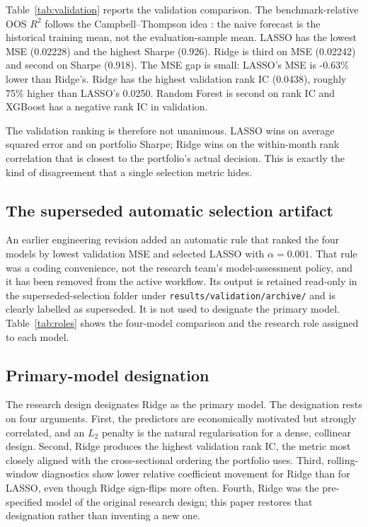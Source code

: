 \documentclass[11pt,a4paper]{article}
\begin{document}
Table~\ref{tab:validation} reports the validation comparison. The benchmark-relative OOS $R^2$ follows the Campbell--Thompson idea \citep{campbell2008}: the naive forecast is the historical training mean, not the evaluation-sample mean. LASSO has the lowest MSE (0.02228) and the highest Sharpe (0.926). Ridge is third on MSE (0.02242) and second on Sharpe (0.918). The MSE gap is small: LASSO's MSE is -0.63\% lower than Ridge's. Ridge has the highest validation rank IC (0.0438), roughly 75\% higher than LASSO's 0.0250. Random Forest is second on rank IC and XGBoost has a negative rank IC in validation.

The validation ranking is therefore not unanimous. LASSO wins on average squared error and on portfolio Sharpe; Ridge wins on the within-month rank correlation that is closest to the portfolio's actual decision. This is exactly the kind of disagreement that a single selection metric hides.



\subsection{The superseded automatic selection artifact}

An earlier engineering revision added an automatic rule that ranked the four models by lowest validation MSE and selected LASSO with $\alpha=0.001$. That rule was a coding convenience, not the research team's model-assessment policy, and it has been removed from the active workflow. Its output is retained read-only in the superseded-selection folder under \texttt{results/validation/archive/} and is clearly labelled as superseded. It is not used to designate the primary model. Table~\ref{tab:roles} shows the four-model comparison and the research role assigned to each model.



\subsection{Primary-model designation}

The research design designates Ridge as the primary model. The designation rests on four arguments. First, the predictors are economically motivated but strongly correlated, and an $L_2$ penalty is the natural regularisation for a dense, collinear design. Second, Ridge produces the highest validation rank IC, the metric most closely aligned with the cross-sectional ordering the portfolio uses. Third, rolling-window diagnostics show lower relative coefficient movement for Ridge than for LASSO, even though Ridge sign-flips more often. Fourth, Ridge was the pre-specified model of the original research design; this paper restores that designation rather than inventing a new one.
\end{document}
